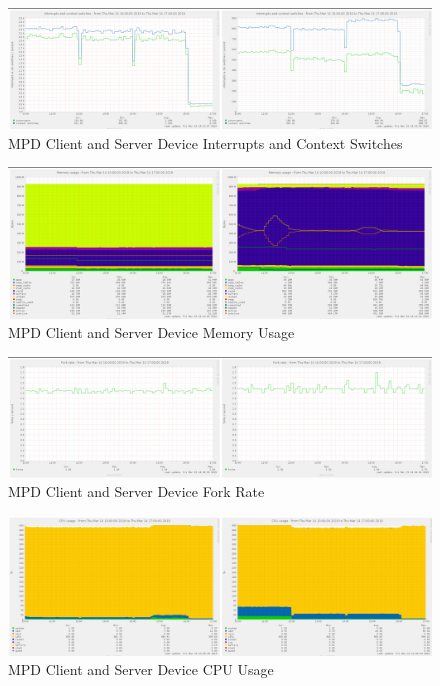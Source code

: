 \documentclass[11pt,a4paper,headinclude=false,footinclude=false]{scrreprt}
\begin{document}
\begin{figure}[H]
\includegraphics{ResultsAndAnalysis/MPDServerTestImages/014MPDInterruptsAndContextSwitches.png}
\centering
\caption{MPD Client and Server Device Interrupts and Context Switches}
\label{MPDIntCont}
\end{figure}

\begin{figure}[H]
\includegraphics{ResultsAndAnalysis/MPDServerTestImages/016MPDMemoryUsage.png}
\centering
\caption{MPD Client and Server Device Memory Usage}
\label{MPDMemUse}
\end{figure}

\begin{figure}[H]
\includegraphics{ResultsAndAnalysis/MPDServerTestImages/012MPDForkRate.png}
\centering
\caption{MPD Client and Server Device Fork Rate}
\label{MPDForkRate}
\end{figure}

\begin{figure}[H]
\includegraphics{ResultsAndAnalysis/MPDServerTestImages/004MPDCPUUsage.png}
\centering
\caption{MPD Client and Server Device CPU Usage}
\label{MPDCPUUsage}
\end{figure}
\end{document}
